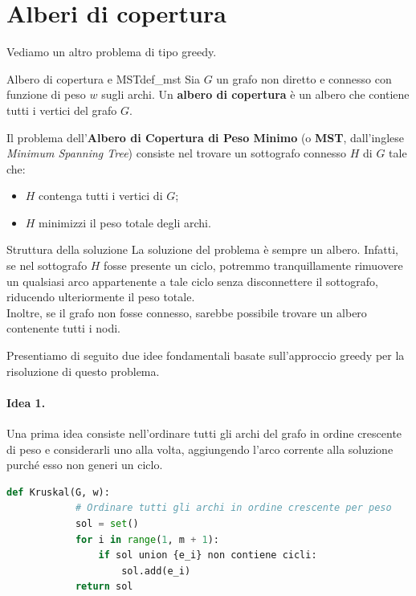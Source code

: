\documentclass[12pt]{report}
\begin{document}
	\section{Alberi di copertura}
	Vediamo un altro problema di tipo greedy.
	
	\begin{definizione}{Albero di copertura e MST}{def_mst}
		Sia $G$ un grafo non diretto e connesso con funzione di peso $w$ sugli archi.
		Un \textbf{albero di copertura} è un albero che contiene tutti i vertici del grafo $G$.
		
		Il problema dell'\textbf{Albero di Copertura di Peso Minimo} (o \textbf{MST}, dall'inglese \emph{Minimum Spanning Tree}) consiste nel trovare un sottografo connesso $H$ di $G$ tale che:
		\begin{itemize}
			\item $H$ contenga tutti i vertici di $G$;
			\item $H$ minimizzi il peso totale degli archi.
		\end{itemize}
	\end{definizione}
	
	\begin{osservazione}{Struttura della soluzione}{}
		La soluzione del problema è sempre un albero. Infatti, se nel sottografo $H$ fosse presente un ciclo, potremmo tranquillamente rimuovere un qualsiasi arco appartenente a tale ciclo senza disconnettere il sottografo, riducendo ulteriormente il peso totale.\\
		Inoltre, se il grafo non fosse connesso, sarebbe possibile trovare un albero contenente tutti i nodi.
	\end{osservazione}
	
	Presentiamo di seguito due idee fondamentali basate sull'approccio greedy per la risoluzione di questo problema.
	
	\paragraph{Idea 1.} Una prima idea consiste nell'ordinare tutti gli archi del grafo in ordine crescente di peso e considerarli uno alla volta, aggiungendo l'arco corrente alla soluzione purché esso non generi un ciclo.
	\newpage
	\begin{lstlisting}[language=Python, caption={Algoritmo di Kruskal}]
		def Kruskal(G, w):
			# Ordinare tutti gli archi in ordine crescente per peso
			sol = set()
			for i in range(1, m + 1):
				if sol union {e_i} non contiene cicli:
					sol.add(e_i)
			return sol
	\end{lstlisting}
	
\end{document}
